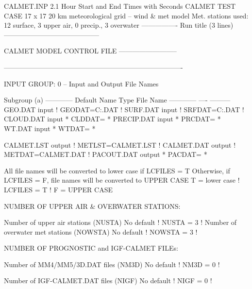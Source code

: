 \documentclass[a4paper,10pt]{article}
\title{}
\author{}
\date{}
\begin{document}
\maketitle

CALMET.INP      2.1             Hour Start and End Times with Seconds
CALMET TEST CASE
17 x 17  20 km meteorological grid -- wind & met model
Met. stations used: 12 surface, 3 upper air, 0 precip., 3 overwater
---------------- Run title (3 lines) ------------------------------------------

                    CALMET MODEL CONTROL FILE
                    --------------------------

-------------------------------------------------------------------------------

INPUT GROUP: 0 -- Input and Output File Names


Subgroup (a)
------------
Default Name  Type          File Name
------------  ----          ---------
GEO.DAT       input    ! GEODAT=C:\CALPUFF\TESTCASE\GEO.DAT       !
SURF.DAT      input    ! SRFDAT=C:\CALPUFF\TESTCASE\SURF.DAT      !
CLOUD.DAT     input    * CLDDAT=            *
PRECIP.DAT    input    * PRCDAT=            *
WT.DAT        input    * WTDAT=             *

CALMET.LST    output   ! METLST=CALMET.LST     !
CALMET.DAT    output   ! METDAT=CALMET.DAT    !
PACOUT.DAT    output   * PACDAT=            *

All file names will be converted to lower case if LCFILES = T
Otherwise, if LCFILES = F, file names will be converted to UPPER CASE
         T = lower case      ! LCFILES = T !
         F = UPPER CASE

NUMBER OF UPPER AIR & OVERWATER STATIONS:

    Number of upper air stations (NUSTA)  No default     ! NUSTA =  3  !
    Number of overwater met stations
                                 (NOWSTA) No default     ! NOWSTA =  3  !

NUMBER OF PROGNOSTIC and IGF-CALMET FILEs:

    Number of MM4/MM5/3D.DAT files
                                 (NM3D) No default       ! NM3D =  0  !

    Number of IGF-CALMET.DAT files
                                 (NIGF)   No default     ! NIGF =  0  !
\end{document}
